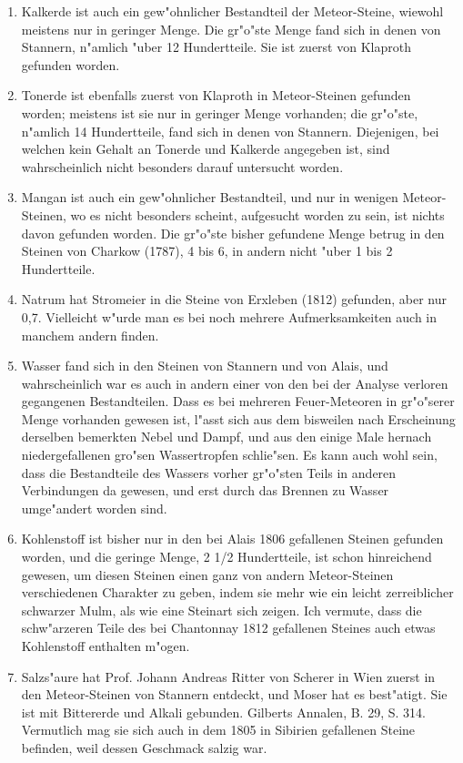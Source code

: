 \documentclass[a4paper, 11pt, oneside, polutonikogreek, german]{article}
\begin{document}
\begin{enumerate}
  \item Kalkerde ist auch ein gew"ohnlicher Bestandteil der Meteor-Steine, wiewohl meistens nur in geringer Menge. Die gr"o"ste Menge fand sich in denen von Stannern, n"amlich "uber 12 Hundertteile. Sie ist zuerst von Klaproth gefunden worden.
  \item Tonerde ist ebenfalls zuerst von Klaproth in Meteor-Steinen gefunden worden; meistens ist sie nur in geringer Menge vorhanden; die gr"o"ste, n"amlich 14 Hundertteile, fand sich in denen von Stannern. Diejenigen, bei welchen kein Gehalt an Tonerde und Kalkerde angegeben ist, sind wahrscheinlich nicht besonders darauf untersucht worden.
  \item Mangan ist auch ein gew"ohnlicher Bestandteil, und nur in wenigen Meteor-Steinen, wo es nicht besonders scheint, aufgesucht worden zu sein, ist nichts davon gefunden worden. Die gr"o"ste bisher gefundene Menge betrug in den Steinen von Charkow (1787), 4 bis 6, in andern nicht "uber 1 bis 2 Hundertteile.
  \item Natrum hat Stromeier in die Steine von Erxleben (1812) gefunden, aber nur 0,7. Vielleicht w"urde man es bei noch mehrere Aufmerksamkeiten auch in manchem andern finden.
  \item Wasser fand sich in den Steinen von Stannern und von Alais, und wahrscheinlich war es auch in andern einer von den bei der Analyse verloren gegangenen Bestandteilen. Dass es bei mehreren Feuer-Meteoren in gr"o"serer Menge vorhanden gewesen ist, l"asst sich aus dem bisweilen nach Erscheinung derselben bemerkten Nebel und Dampf, und aus den einige Male hernach niedergefallenen gro"sen Wassertropfen schlie"sen. Es kann auch wohl sein, dass die Bestandteile des Wassers vorher gr"o"sten Teils in anderen Verbindungen da gewesen, und erst durch das Brennen zu Wasser umge"andert worden sind.
  \item Kohlenstoff ist bisher nur in den bei Alais 1806 gefallenen Steinen gefunden worden, und die geringe Menge, 2 1/2 Hundertteile, ist schon hinreichend gewesen, um diesen Steinen einen ganz von andern Meteor-Steinen verschiedenen Charakter zu geben, indem sie mehr wie ein leicht zerreiblicher schwarzer Mulm, als wie eine Steinart sich zeigen. Ich vermute, dass die schw"arzeren Teile des bei Chantonnay 1812 gefallenen Steines auch etwas Kohlenstoff enthalten m"ogen.
  \item Salzs"aure hat Prof. Johann Andreas Ritter von Scherer in Wien zuerst in den Meteor-Steinen von Stannern entdeckt, und Moser hat es best"atigt. Sie ist mit Bittererde und Alkali gebunden. Gilberts Annalen, B. 29, S. 314. Vermutlich mag sie sich auch in dem 1805 in Sibirien gefallenen Steine befinden, weil dessen Geschmack salzig war.
\end{enumerate}
\end{document}
